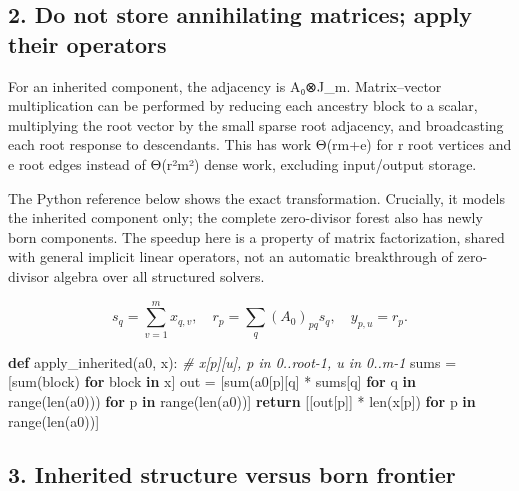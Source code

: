 \documentclass[
  10pt,
]{article}
\newenvironment{Shaded}{}{}
\newcommand{\BuiltInTok}[1]{\textcolor[rgb]{0.00,0.50,0.00}{#1}}
\newcommand{\CommentTok}[1]{\textcolor[rgb]{0.38,0.63,0.69}{\textit{#1}}}
\newcommand{\ControlFlowTok}[1]{\textcolor[rgb]{0.00,0.44,0.13}{\textbf{#1}}}
\newcommand{\KeywordTok}[1]{\textcolor[rgb]{0.00,0.44,0.13}{\textbf{#1}}}
\newcommand{\NormalTok}[1]{#1}
\newcommand{\OperatorTok}[1]{\textcolor[rgb]{0.40,0.40,0.40}{#1}}
\begin{document}
\subsection{2. Do not store annihilating matrices; apply their
operators}\label{do-not-store-annihilating-matrices-apply-their-operators}

For an inherited component, the adjacency is A₀⊗J\_m. Matrix--vector
multiplication can be performed by reducing each ancestry block to a
scalar, multiplying the root vector by the small sparse root adjacency,
and broadcasting each root response to descendants. This has work
Θ(rm+e) for r root vertices and e root edges instead of Θ(r²m²) dense
work, excluding input/output storage.

The Python reference below shows the exact transformation. Crucially, it
models the inherited component only; the complete zero-divisor forest
also has newly born components. The speedup here is a property of matrix
factorization, shared with general implicit linear operators, not an
automatic breakthrough of zero-divisor algebra over all structured
solvers.

\[
s_q=\sum_{v=1}^{m} x_{q,v},\quad r_p=\sum_q (A_0)_{pq}s_q,\quad y_{p,u}=r_p.
\tag{1}
\]

\begin{Shaded}
\begin{Highlighting}[]
\KeywordTok{def}\NormalTok{ apply\_inherited(a0, x):}
    \CommentTok{\# x[p][u], p in 0..root{-}1, u in 0..m{-}1}
\NormalTok{    sums }\OperatorTok{=}\NormalTok{ [}\BuiltInTok{sum}\NormalTok{(block) }\ControlFlowTok{for}\NormalTok{ block }\KeywordTok{in}\NormalTok{ x]}
\NormalTok{    out }\OperatorTok{=}\NormalTok{ [}\BuiltInTok{sum}\NormalTok{(a0[p][q] }\OperatorTok{*}\NormalTok{ sums[q] }\ControlFlowTok{for}\NormalTok{ q }\KeywordTok{in} \BuiltInTok{range}\NormalTok{(}\BuiltInTok{len}\NormalTok{(a0)))}
           \ControlFlowTok{for}\NormalTok{ p }\KeywordTok{in} \BuiltInTok{range}\NormalTok{(}\BuiltInTok{len}\NormalTok{(a0))]}
    \ControlFlowTok{return}\NormalTok{ [[out[p]] }\OperatorTok{*} \BuiltInTok{len}\NormalTok{(x[p]) }\ControlFlowTok{for}\NormalTok{ p }\KeywordTok{in} \BuiltInTok{range}\NormalTok{(}\BuiltInTok{len}\NormalTok{(a0))]}
\end{Highlighting}
\end{Shaded}

\subsection{3. Inherited structure versus born
frontier}\label{inherited-structure-versus-born-frontier}
\end{document}
